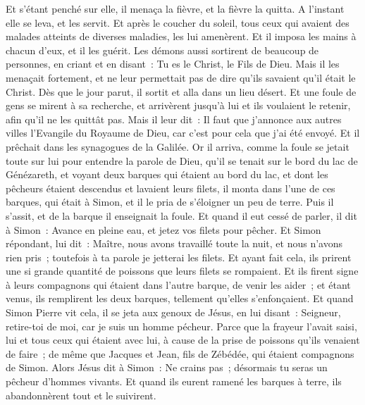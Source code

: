 \begin{multicols}{2}
Et s'étant penché sur elle, il menaça la fièvre, et la fièvre la quitta. A l'instant elle se leva, et les servit.
Et après le coucher du soleil, tous ceux qui avaient des malades atteints de diverses maladies, les lui amenèrent. Et il imposa les mains à chacun d'eux, et il les guérit.
Les démons aussi sortirent de beaucoup de personnes, en criant et en disant~: Tu es le Christ, le Fils de Dieu. Mais il les menaçait fortement, et ne leur permettait pas de dire qu'ils savaient qu'il était le Christ.
Dès que le jour parut, il sortit et alla dans un lieu désert. Et une foule de gens se mirent à sa recherche, et arrivèrent jusqu'à lui et ils voulaient le retenir, afin qu'il ne les quittât pas.
Mais il leur dit~: Il faut que j'annonce aux autres villes l'Evangile du Royaume de Dieu, car c'est pour cela que j'ai été envoyé.
Et il prêchait dans les synagogues de la Galilée.
\VerseOne{}Or il arriva, comme la foule se jetait toute sur lui pour entendre la parole de Dieu, qu'il se tenait sur le bord du lac de Génézareth,
et voyant deux barques qui étaient au bord du lac, et dont les pêcheurs étaient descendus et lavaient leurs filets, il monta dans l'une de ces barques, qui était à Simon,
et il le pria de s'éloigner un peu de terre. Puis il s'assit, et de la barque il enseignait la foule.
Et quand il eut cessé de parler, il dit à Simon~: Avance en pleine eau, et jetez vos filets pour pêcher.
Et Simon répondant, lui dit~: Maître, nous avons travaillé toute la nuit, et nous n'avons rien pris~; toutefois à ta parole je jetterai les filets.
Et ayant fait cela, ils prirent une si grande quantité de poissons que leurs filets se rompaient.
Et ils firent signe à leurs compagnons qui étaient dans l'autre barque, de venir les aider~; et étant venus, ils remplirent les deux barques, tellement qu'elles s'enfonçaient.
Et quand Simon Pierre vit cela, il se jeta aux genoux de Jésus, en lui disant~: Seigneur, retire-toi de moi, car je suis un homme pécheur.
Parce que la frayeur l'avait saisi, lui et tous ceux qui étaient avec lui, à cause de la prise de poissons qu'ils venaient de faire~; de même que Jacques et Jean, fils de Zébédée, qui étaient compagnons de Simon.
Alors Jésus dit à Simon~: Ne crains pas~; désormais tu seras un pêcheur d'hommes vivants.
Et quand ils eurent ramené les barques à terre, ils abandonnèrent tout et le suivirent.

\end{multicols}
